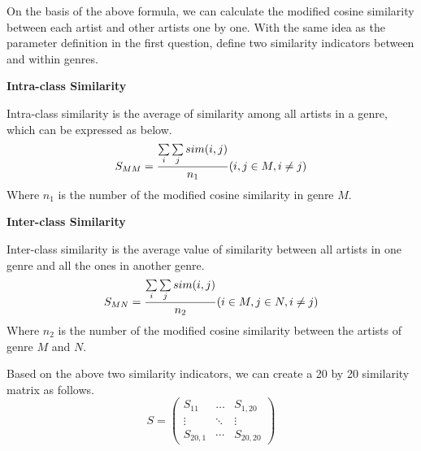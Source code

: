 \documentclass{mcmthesis}
\begin{document}
On the basis of the above formula, we can calculate the modified cosine similarity between each artist and other artists one by one. With the same idea as the parameter definition in the first question, define two similarity indicators between and within genres.

\noindent%
\textbf{Intra-class Similarity}

Intra-class similarity is the average of similarity among all artists in a genre, which can be expressed as below.
\begin{equation}
{S_{MM}} = \frac{{\sum\limits_i {\sum\limits_j {sim(i,j)} } }}{{{n_1}}}{\rm{       (}}i,j \in M,i \ne j)
\end{equation}
Where $n_{1}$ is the number of the modified cosine similarity
in genre $M$.

\noindent%
\textbf{Inter-class Similarity}

Inter-class similarity is the average value of similarity between all artists in one genre and all the ones in another genre.
\begin{equation}
{S_{MN}} = \frac{{\sum\limits_i {\sum\limits_j {sim(i,j)} } }}{{{n_2}}}{\rm{       (}}i \in M,j \in N,i \ne j)
\end{equation}
Where $n_{2}$ is the number of the modified cosine similarity
between the artists of genre $M$ and $N$.

Based on the above two similarity indicators, we can create a 20 by 20 similarity matrix as follows.
\begin{equation}
S = \left( {\begin{array}{*{20}{c}}
	{{S_{11}}}& \ldots &{{S_{1,20}}}\\
	\vdots & \ddots & \vdots \\
	{{S_{20,1}}}& \cdots &{{S_{20,20}}}
	\end{array}} \right)
\end{equation}
\end{document}
